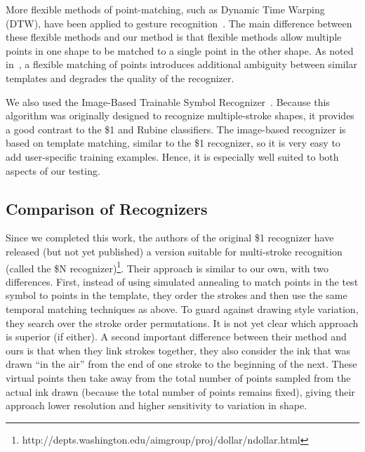 \documentclass{egpubl}
\begin{document}
More flexible methods of point-matching, such as Dynamic Time Warping (DTW), have been applied to gesture recognition~\cite{dollar,shark2}. The main difference between these flexible methods and our method is that flexible methods allow multiple points in one shape to be matched to a single point in the other shape. As noted in~\cite{shark2}, a flexible matching of points introduces additional ambiguity between similar templates and degrades the quality of the recognizer.



We also used the Image-Based Trainable Symbol Recognizer~\cite{Kara2005ImageBased}.  Because this algorithm was originally designed to recognize multiple-stroke shapes, it provides a good contrast to the \$1 and Rubine classifiers. The image-based recognizer is based on template matching, similar to the \$1 recognizer, so it is very easy to add user-specific training examples. Hence, it is especially well suited to both aspects of our testing.

\subsection{Comparison of Recognizers}
Since we completed this work, the authors of the original \$1 recognizer have released (but not yet published) a version suitable for multi-stroke recognition (called the \$N recognizer)\footnote{http://depts.washington.edu/aimgroup/proj/dollar/ndollar.html}.  Their approach is similar to our own, with two differences.  First,  instead of using simulated annealing to match points in the test symbol to points in the template, they order the strokes and then use the same temporal matching techniques as above.  To guard against drawing style variation, they search over the stroke order permutations.   It is not yet clear which approach is superior (if either).  A second important difference between their method and ours is that when they link strokes together, they also consider the ink that was drawn ``in the air'' from the end of one stroke to the beginning of the next.   These virtual points then take away from the total number of points sampled from the actual ink drawn (because the total number of points remains fixed), giving their approach lower resolution and higher sensitivity to variation in shape.
\end{document}
